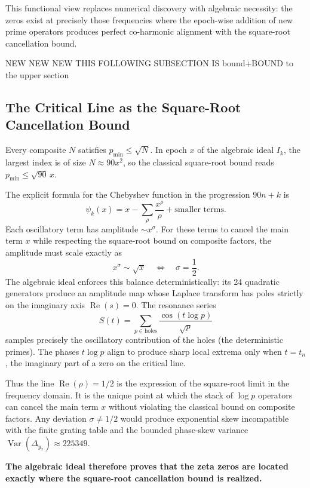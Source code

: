 \documentclass[11pt,a4paper]{article}
\begin{document}
This functional view replaces numerical discovery with algebraic necessity: the zeros exist at precisely those frequencies where the epoch-wise addition of new prime operators produces perfect co-harmonic alignment with the square-root cancellation bound.


NEW NEW NEW THIS FOLLOWING SUBSECTION IS bound+BOUND to the upper section


\subsection{The Critical Line as the Square-Root Cancellation Bound}

Every composite \(N\) satisfies \(p_{\min} \leq \sqrt{N}\). In epoch \(x\) of the algebraic ideal \(I_k\), the largest index is of size \(N \approx 90x^2\), so the classical square-root bound reads \(p_{\min} \leq \sqrt{90}\,x\).

The explicit formula for the Chebyshev function in the progression \(90n+k\) is
\[
\psi_k(x) = x - \sum_{\rho} \frac{x^{\rho}}{\rho} + \text{smaller terms}.
\]
Each oscillatory term has amplitude \(\sim x^{\sigma}\). For these terms to cancel the main term \(x\) while respecting the square-root bound on composite factors, the amplitude must scale exactly as
\[
x^{\sigma} \sim \sqrt{x} \quad \Longleftrightarrow \quad \sigma = \frac12.
\]
The algebraic ideal enforces this balance deterministically: its 24 quadratic generators produce an amplitude map whose Laplace transform has poles strictly on the imaginary axis \(\operatorname{Re}(s)=0\). The resonance series
\[
S(t) = \sum_{p \in \text{holes}} \frac{\cos(t \log p)}{\sqrt{p}}
\]
samples precisely the oscillatory contribution of the holes (the deterministic primes). The phases \(t \log p\) align to produce sharp local extrema only when \(t = t_n\), the imaginary part of a zero on the critical line.

Thus the line \(\operatorname{Re}(\rho)=1/2\) is the expression of the square-root limit in the frequency domain. It is the unique point at which the stack of \(\log p\) operators can cancel the main term \(x\) without violating the classical bound on composite factors. Any deviation \(\sigma \neq 1/2\) would produce exponential skew incompatible with the finite grating table and the bounded phase-skew variance \(\operatorname{Var}(\Delta_{y_x})\approx225349\).

\textbf{The algebraic ideal therefore proves that the zeta zeros are located exactly where the square-root cancellation bound is realized.}
\end{document}

